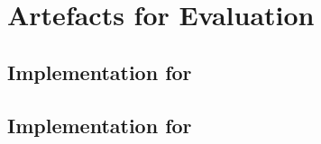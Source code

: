 \chapter{Artefacts for Evaluation}
\label{chapter:evalcode}

\section{Implementation for }
\label{section:evalcodegame}


\section{Implementation for }
\label{section:evalcodetwobuyer}

